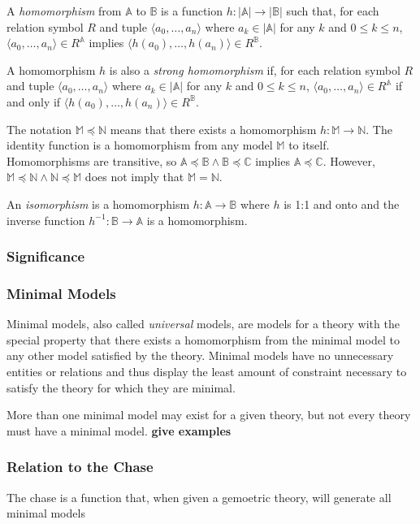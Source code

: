 	A \emph{homomorphism} from $\mathbb{A}$ to $\mathbb{B}$ is a function $h:
	|\mathbb{A}|\to|\mathbb{B}|$ such that, for each relation symbol $R$ and
	tuple $\langle a_0 , \ldots , a_n \rangle$ where $a_k \in |\mathbb{A}|$ for
	any $k$ and $0 \le k \le n$, $\langle a_0 , \ldots , a_n  \rangle \in
	R^\mathbb{A}$ implies $\langle h(a_0) , \ldots , h(a_n)  \rangle \in
	R^\mathbb{B}$.

	A homomorphism $h$ is also a \emph{strong homomorphism} if, for each
	relation symbol $R$ and tuple $\langle a_0 , \ldots , a_n \rangle$ where
	$a_k \in |\mathbb{A}|$ for any $k$ and $0 \le k \le n$, $\langle a_0 ,
	\ldots , a_n  \rangle \in R^\mathbb{A}$ if and only if $\langle h(a_0) ,
	\ldots , h(a_n)  \rangle \in R^\mathbb{B}$.

	The notation $\mathbb{M} \preceq \mathbb{N}$ means that there exists a
	homomorphism $h : \mathbb{M} \to \mathbb{N}$. The identity function is a
	homomorphism from any model $\mathbb{M}$ to itself.  Homomorphisms are
	transitive, so $\mathbb{A} \preceq \mathbb{B} \wedge \mathbb{B} \preceq
	\mathbb{C}$ implies $\mathbb{A} \preceq \mathbb{C}$. However, $\mathbb{M}
	\preceq \mathbb{N} \wedge \mathbb{N} \preceq \mathbb{M}$ does not imply
	that $\mathbb{M} = \mathbb{N}$.

	An \emph{isomorphism} is a homomorphism $h : \mathbb{A} \to \mathbb{B}$
	where $h$ is 1:1 and onto and the inverse function $h^{-1} : \mathbb{B} \to
	\mathbb{A}$ is a homomorphism.

		\subsubsection{Significance}

		\subsubsection{Minimal Models}

		Minimal models, also called \emph{universal} models, are models for a
		theory with the special property that there exists a homomorphism from
		the minimal model to any other model satisfied by the theory. Minimal
		models have no unnecessary entities or relations and thus display the
		least amount of constraint necessary to satisfy the theory for which
		they are minimal.

		More than one minimal model may exist for a given theory, but not every
		theory must have a minimal model. \textbf{give examples}

		\subsubsection{Relation to the Chase}

		The chase is a function that, when given a gemoetric theory, will generate all minimal models
